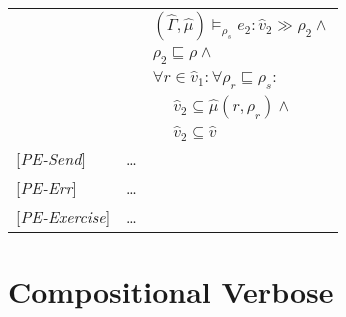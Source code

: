 \documentclass[[12pt,a4paper,twoside,openrigh]{article}
\newcommand{\vat}[0]{\hat{v}}
\newcommand{\muat}[0]{\hat{\mu}}
\newcommand{\Env}[0]{\hat{\Gamma}}
\newcommand{\modelrho}{\models_{\rho_s}}
\newcommand{\aenvs}{(\Env,\muat)}
\newcommand{\caesti}[2]{\aenvs \modelrho #1 : \vat_{#2} \gg \rho_{#2}}
\begin{document}
\begin{tabular} {l l l l}
&&\multicolumn{2}{l}{$ \caesti {e_2} {2} \wedge $}\\
&&\multicolumn{2}{l}{$\rho_2 \sqsubseteq \rho \wedge$}\\
&&\multicolumn{2}{l}{$\forall r \in \vat_1 : \forall \rho_r \sqsubseteq \rho_s :$}\\
&&&$\vat_2 \subseteq \muat(r, \rho_r) \wedge$ \\
&&&$\vat_2 \subseteq \vat $\\
{[\textit{PE-Send}]}& \dots \\
{[\textit{PE-Err}]}& \dots \\
{[\textit{PE-Exercise}]}& \dots \\
\end{tabular}

\section{Compositional Verbose}
\end{document}
